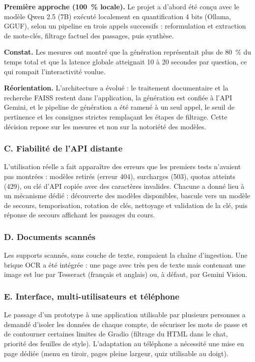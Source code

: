 \documentclass[12pt,a4paper,oneside]{report}
\begin{document}
\textbf{Première approche (100~\% locale).} Le projet a d'abord été conçu avec le modèle Qwen 2.5 (7B) exécuté localement en quantification 4 bits (Ollama, GGUF), selon un pipeline en trois appels successifs : reformulation et extraction de mots-clés, filtrage factuel des passages, puis synthèse.

\textbf{Constat.} Les mesures ont montré que la génération représentait plus de 80~\% du temps total et que la latence globale atteignait 10 à 20 secondes par question, ce qui rompait l'interactivité voulue.

\textbf{Réorientation.} L'architecture a évolué : le traitement documentaire et la recherche FAISS restent dans l'application, la génération est confiée à l'API Gemini, et le pipeline de génération a été ramené à un seul appel, le seuil de pertinence et les consignes strictes remplaçant les étapes de filtrage. Cette décision repose sur les mesures et non sur la notoriété des modèles.

\subsubsection*{C. Fiabilité de l'API distante}

L'utilisation réelle a fait apparaître des erreurs que les premiers tests n'avaient pas montrées : modèles retirés (erreur 404), surcharges (503), quotas atteints (429), ou clé d'API copiée avec des caractères invalides. Chacune a donné lieu à un mécanisme dédié : découverte des modèles disponibles, bascule vers un modèle de secours, temporisation, rotation de clés, nettoyage et validation de la clé, puis réponse de secours affichant les passages du cours.

\subsubsection*{D. Documents scannés}

Les supports scannés, sans couche de texte, rompaient la chaîne d'ingestion. Une brique OCR a été intégrée : une page avec très peu de texte mais contenant une image est lue par Tesseract (français et anglais) ou, à défaut, par Gemini Vision.

\subsubsection*{E. Interface, multi-utilisateurs et téléphone}

Le passage d'un prototype à une application utilisable par plusieurs personnes a demandé d'isoler les données de chaque compte, de sécuriser les mots de passe et de contourner certaines limites de Gradio (filtrage du HTML dans le chat, priorité des feuilles de style). L'adaptation au téléphone a nécessité une mise en page dédiée (menu en tiroir, pages pleine largeur, quiz utilisable au doigt).
\end{document}
